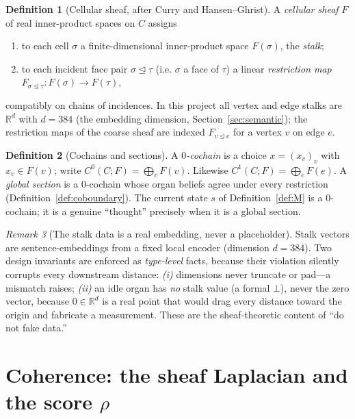 \documentclass[11pt]{article}
\theoremstyle{definition}
\newtheorem{definition}{Definition}[section]
\theoremstyle{plain}
\theoremstyle{remark}
\newtheorem{remark}[definition]{Remark}
\newcommand{\CC}{C}                 %
\newcommand{\Fs}{F}                 %
\newcommand{\Rd}{\mathbb{R}^{d}}
\newcommand{\rest}[1]{F_{#1}}
\newcommand{\triang}{\trianglelefteq}
\begin{document}
\begin{definition}[Cellular sheaf, after Curry and Hansen--Ghrist]\label{def:sheaf}
A \emph{cellular sheaf} $\Fs$ of real inner-product spaces on $\CC$ assigns
\begin{enumerate}[label=(\roman*),nosep]
  \item to each cell $\sigma$ a finite-dimensional inner-product space
        $\Fs(\sigma)$, the \emph{stalk};
  \item to each incident face pair $\sigma\triang\tau$ (i.e. $\sigma$ a face of
        $\tau$) a linear \emph{restriction map}
        $\rest{\sigma\triang\tau}:\Fs(\sigma)\to\Fs(\tau)$,
\end{enumerate}
compatibly on chains of incidences. In this project all vertex and edge stalks are
$\Rd$ with $d=384$ (the embedding dimension, Section~\ref{sec:semantic}); the
restriction maps of the coarse sheaf are indexed $\rest{v\triang e}$ for a vertex $v$
on edge $e$.
\end{definition}

\begin{definition}[Cochains and sections]
A \emph{$0$-cochain} is a choice $x=(x_v)_{v}$ with $x_v\in\Fs(v)$; write
$C^0(\CC;\Fs)=\bigoplus_v \Fs(v)$. Likewise $C^1(\CC;\Fs)=\bigoplus_e \Fs(e)$. A
\emph{global section} is a $0$-cochain whose organ beliefs agree under every
restriction (Definition~\ref{def:coboundary}). The current state $s$ of
Definition~\ref{def:M} is a $0$-cochain; it is a genuine ``thought'' precisely when it
is a global section.
\end{definition}

\begin{remark}[The stalk data is a real embedding, never a placeholder]\label{rem:embed}
Stalk vectors are sentence-embeddings from a fixed local encoder (dimension
$d=384$). Two design invariants are enforced as \emph{type-level} facts, because their
violation silently corrupts every downstream distance: \emph{(i)} dimensions never
truncate or pad---a mismatch raises; \emph{(ii)} an idle organ has \emph{no} stalk
value (a formal $\bot$), never the zero vector, because $0\in\Rd$ is a real point that
would drag every distance toward the origin and fabricate a measurement. These are the
sheaf-theoretic content of ``do not fake data.''
\end{remark}

\section{Coherence: the sheaf Laplacian and the score \texorpdfstring{$\rho$}{rho}}\label{sec:coherence}
\end{document}
